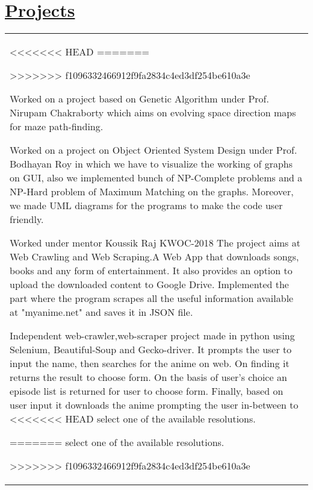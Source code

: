 \documentclass[a4paper,10pt]{extarticle} %
\begin{document}
\vspace{-0.3cm}
\section{\textcolor{primary}{\href{https://www.github.com/CircleJerkHug}{Projects}}}
\vspace{-0.6cm}
\begin{tabular}{p{19.7cm}}
\begin{description}[style=nextline, font=$\bullet$\hspace{2mm}\normalsize]

<<<<<<< HEAD
=======

 
>>>>>>> f1096332466912f9fa2834c4ed3df254be610a3e
 
\item[Genetic Algorithm Project]
 Worked on a project based on Genetic Algorithm under Prof. Nirupam Chakraborty which aims on evolving space direction maps for maze path-finding.
 
\item[{\href{https://github.com/CircleJerkHug/Pygraph}{Pygraph}}] 
Worked on a project on Object Oriented System Design under Prof. Bodhayan Roy in which we have to visualize the working of graphs on GUI, also we implemented bunch of NP-Complete problems and a NP-Hard problem of Maximum Matching on the graphs. Moreover, we made UML diagrams for the programs to make the code user friendly.

\item[{\href{https://github.com/CircleJerkHug/Artemis-arrow}{Artemis-Arrow}}, KWOC-2018]
Worked under mentor Koussik Raj KWOC-2018 The project aims at Web Crawling and Web Scraping.A Web App that downloads songs, books and any form of entertainment. It also provides an option to upload the downloaded content to Google Drive. Implemented the part where the program scrapes all the useful information available at "myanime.net" and saves it in JSON file.

\item[{\href{https://github.com/CircleJerkHug/Anime-Downloader}{Anime-Downloader}}]
Independent web-crawler,web-scraper project made in python using Selenium, Beautiful-Soup and
Gecko-driver. It prompts the user to input the name, then searches for the anime on web. On finding
it returns the result to choose form. On the basis of user’s choice an episode list is returned for user
to choose form. Finally, based on user input it downloads the anime prompting the user in-between to
<<<<<<< HEAD
select one of the available resolutions. \vspace
 
=======
select one of the available resolutions.
 

>>>>>>> f1096332466912f9fa2834c4ed3df254be610a3e
\end{description}
\end{tabular}
\vspace{0.4cm}
\end{document}
